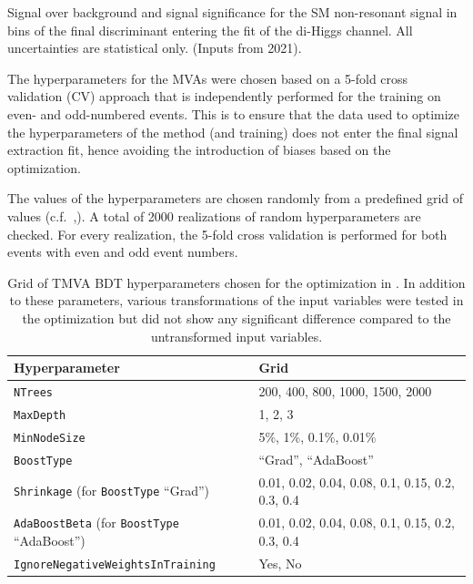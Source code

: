 \begin{table}
  \centering
  {
    \footnotesize
    
  }
  \caption{Signal over background and signal significance for the SM
    non-resonant signal in bins of the final discriminant entering the
    fit of the di-Higgs \hadhad channel. All uncertainties are
    statistical only. (Inputs from 2021).}
  \label{tab:significance_smbdt_bins_HadHad}
\end{table}

The hyperparameters for the MVAs were chosen based on a 5-fold cross
validation (CV) approach that is independently performed for the
training on even- and odd-numbered events. This is to ensure that the
data used to optimize the hyperparameters of the method (and training)
does not enter the final signal extraction fit, hence avoiding the
introduction of biases based on the optimization.

The values of the hyperparameters are chosen randomly from a
predefined grid of values
(c.f.~,). A
total of 2000 realizations of random hyperparameters are checked. For
every realization, the 5-fold cross validation is performed for both
events with even and odd event numbers.

\begin{table}
  \centering
  \begin{tabular}{ll}
    \toprule
    Hyperparameter & Grid \\
    \midrule
    \texttt{NTrees} & 200, 400, 800, 1000, 1500, 2000 \\
    \texttt{MaxDepth} & 1, 2, 3 \\
    \texttt{MinNodeSize} & 5\%, 1\%, 0.1\%, 0.01\% \\
    \texttt{BoostType} & ``Grad'', ``AdaBoost''\\
    \texttt{Shrinkage} (for \texttt{BoostType} ``Grad'') & 0.01, 0.02, 0.04, 0.08, 0.1, 0.15, 0.2, 0.3, 0.4 \\
    \texttt{AdaBoostBeta} (for \texttt{BoostType} ``AdaBoost'') & 0.01, 0.02, 0.04, 0.08, 0.1, 0.15, 0.2, 0.3, 0.4 \\
    \texttt{IgnoreNegativeWeightsInTraining} & Yes, No \\
    \bottomrule
  \end{tabular}
  \caption{Grid of TMVA BDT hyperparameters chosen for the
    optimization in \hadhad. In addition to these parameters, various
    transformations of the input variables were tested in the
    optimization but did not show any significant difference compared
    to the untransformed input variables.}
  \label{tab:hadhad_mva_bdt_param_grid}
\end{table}


